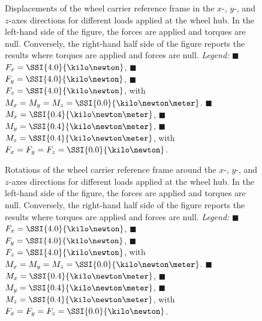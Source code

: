 \begin{figure}[htp]
  \centering
  \small{}
  \caption{Displacements of the wheel carrier reference frame in the $x$-, $y$-, and $z$-axes directions for different loads applied at the wheel hub. In the left-hand side of the figure, the forces are applied and torques are null. Conversely, the right-hand half side of the figure reports the results where torques are applied and forces are null. \emph{Legend:} {\color{mycolor1}$\blacksquare$}~$F_x = \SSI{4.0}{\kilo\newton}$, {\color{mycolor2}$\blacksquare$}~$F_y = \SSI{4.0}{\kilo\newton}$, {\color{mycolor3}$\blacksquare$}~$F_z = \SSI{4.0}{\kilo\newton}$, with $M_x = M_y = M_z = \SSI{0.0}{\kilo\newton\meter}$. {\color{mycolor4}$\blacksquare$}~$M_x = \SSI{0.4}{\kilo\newton\meter}$, {\color{mycolor5}$\blacksquare$}~$M_y = \SSI{0.4}{\kilo\newton\meter}$, {\color{mycolor6}$\blacksquare$}~$M_z = \SSI{0.4}{\kilo\newton\meter}$, with $F_x = F_y = F_z = \SSI{0.0}{\kilo\newton}$.}
  \label{app4:fig:translations}
\end{figure}

\begin{figure}[htp]
  \centering
  \small{}
  \caption{Rotations of the wheel carrier reference frame around the $x$-, $y$-, and $z$-axes directions for different loads applied at the wheel hub. In the left-hand side of the figure, the forces are applied and torques are null. Conversely, the right-hand half side of the figure reports the results where torques are applied and forces are null. \emph{Legend:} {\color{mycolor1}$\blacksquare$}~$F_x = \SSI{4.0}{\kilo\newton}$, {\color{mycolor2}$\blacksquare$}~$F_y = \SSI{4.0}{\kilo\newton}$, {\color{mycolor3}$\blacksquare$}~$F_z = \SSI{4.0}{\kilo\newton}$, with $M_x = M_y = M_z = \SSI{0.0}{\kilo\newton\meter}$. {\color{mycolor4}$\blacksquare$}~$M_x = \SSI{0.4}{\kilo\newton\meter}$, {\color{mycolor5}$\blacksquare$}~$M_y = \SSI{0.4}{\kilo\newton\meter}$, {\color{mycolor6}$\blacksquare$}~$M_z = \SSI{0.4}{\kilo\newton\meter}$, with $F_x = F_y = F_z = \SSI{0.0}{\kilo\newton}$.}
  \label{app4:fig:rotations}
\end{figure}

